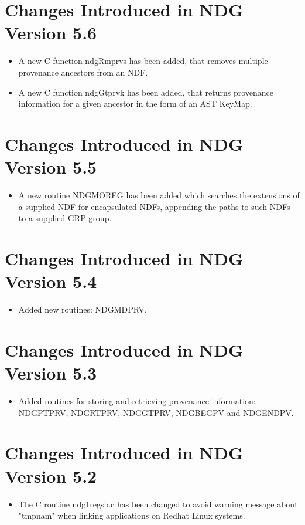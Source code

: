 \documentclass[twoside,11pt]{article}
\renewcommand{\_}{\texttt{\symbol{95}}}
\begin{document}
\section{Changes Introduced in NDG Version 5.6}
\begin{itemize}
   \item A new C function ndgRmprvs has been added, that removes multiple
         provenance ancestors from an NDF.
   \item A new C function ndgGtprvk has been added, that returns provenance
         information for a given ancestor in the form of an AST KeyMap.
\end{itemize}

\section{Changes Introduced in NDG Version 5.5}
\begin{itemize}
   \item A new routine NDG\_MOREG has been added which searches the
         extensions of a supplied NDF for encapsulated NDFs, appending
         the paths to such NDFs to a supplied GRP group.
\end{itemize}

\section{Changes Introduced in NDG Version 5.4}
\begin{itemize}
   \item Added new routines: NDG\_MDPRV.
\end{itemize}

\section{Changes Introduced in NDG Version 5.3}
\begin{itemize}
   \item Added routines for storing and retrieving provenance information:
         NDG\_PTPRV, NDG\_RTPRV, NDG\_GTPRV, NDG\_BEGPV and NDG\_ENDPV.
\end{itemize}

\section{Changes Introduced in NDG Version 5.2}
\begin{itemize}
   \item The C routine ndg1\_regsb.c has been changed to avoid warning
         message about "tmpnam" when linking applications on Redhat Linux
	 systems.
\end{itemize}
\end{document}
